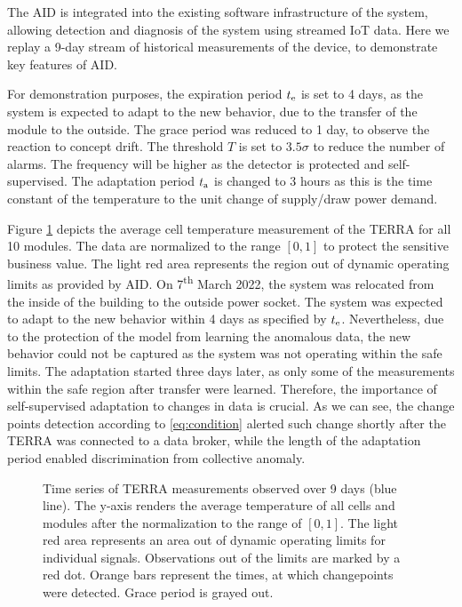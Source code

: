 The AID is integrated into the existing software infrastructure of the system, allowing detection and diagnosis of the system using streamed IoT data. Here we replay a 9-day stream of historical measurements of the device, to demonstrate key features of AID. 

For demonstration purposes, the expiration period $t _{\text{e}}$ is set to 4 days, as the system is expected to adapt to the new behavior, due to the transfer of the module to the outside. The grace period was reduced to 1 day, to observe the reaction to concept drift. The threshold $T$ is set to $3.5 \sigma$ to reduce the number of alarms. The frequency will be higher as the detector is protected and self-supervised. The adaptation period $t _{\text{a}}$ is changed to 3 hours as this is the time constant of the temperature to the unit change of supply/draw power demand. 

Figure \ref{fig:terra_no_change} depicts the average cell temperature measurement of the TERRA for all 10 modules. The data are normalized to the range $[0, 1]$ to protect the sensitive business value. The light red area represents the region out of dynamic operating limits as provided by AID. On 7\textsuperscript{th} March 2022, the system was relocated from the inside of the building to the outside power socket. The system was expected to adapt to the new behavior within 4 days as specified by $t _{\text{e}}$. Nevertheless, due to the protection of the model from learning the anomalous data, the new behavior could not be captured as the system was not operating within the safe limits. The adaptation started three days later, as only some of the measurements within the safe region after transfer were learned. Therefore, the importance of self-supervised adaptation to changes in data is crucial. As we can see, the change points detection according to \eqref{eq:condition} alerted such change shortly after the TERRA was connected to a data broker, while the length of the adaptation period enabled discrimination from collective anomaly.

\begin{figure}
 \centering
 \caption{Time series of TERRA measurements observed over 9 days (blue line). The y-axis renders the average temperature of all cells and modules after the normalization to the range of $[0, 1]$. The light red area represents an area out of dynamic operating limits for individual signals. Observations out of the limits are marked by a red dot. Orange bars represent the times, at which changepoints were detected. Grace period is grayed out.}
 \label{fig:terra_no_change}
\end{figure}

